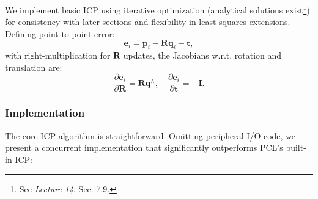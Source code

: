 We implement basic ICP using iterative optimization (analytical solutions exist\footnote{See \textit{Lecture 14}, Sec. 7.9.}) for consistency with later sections and flexibility in least-squares extensions. Defining point-to-point error:  
\begin{equation}\label{key}  
	\bm{e}_i = \bm{p}_i - \bm{R} \bm{q}_i - \bm{t},  
\end{equation}  
with right-multiplication for $\bm{R}$ updates, the Jacobians w.r.t. rotation and translation are:  
\begin{equation}\label{eq:p2p-icp-jacobian}  
	\frac{\partial \bm{e}_i}{\partial \bm{R}} = \bm{R} \bm{q}^\wedge, \quad \frac{\partial \bm{e}_i}{\partial \bm{t}} = -\bm{I}.  
\end{equation}

\subsubsection{Implementation}
The core ICP algorithm is straightforward. Omitting peripheral I/O code, we present a concurrent implementation that significantly outperforms PCL's built-in ICP:

